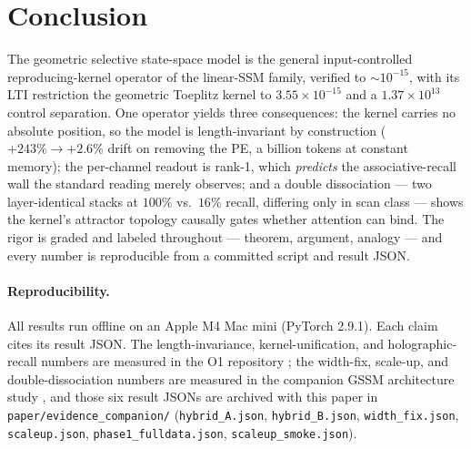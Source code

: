 \documentclass[11pt]{article}
\theoremstyle{definition}
\newcommand{\code}[1]{\texttt{#1}}
\begin{document}
\section{Conclusion}
The geometric selective state-space model is the general input-controlled reproducing-kernel
operator of the linear-SSM family, verified to $\sim\!10^{-15}$, with its LTI restriction the
geometric Toeplitz kernel to $3.55\times10^{-15}$ and a $1.37\times10^{13}$ control separation.
One operator yields three consequences: the kernel carries no absolute position, so the model is
length-invariant by construction ($+243\%\to+2.6\%$ drift on removing the PE, a billion tokens at
constant memory); the per-channel readout is rank-1, which \emph{predicts} the associative-recall
wall the standard reading merely observes; and a double dissociation --- two layer-identical stacks
at $100\%$ vs.\ $16\%$ recall, differing only in scan class --- shows the kernel's attractor
topology causally gates whether attention can bind. The rigor is graded and labeled throughout ---
theorem, argument, analogy --- and every number is reproducible from a committed script and result
JSON.

\paragraph{Reproducibility.} All results run offline on an Apple M4 Mac mini (PyTorch 2.9.1).
Each claim cites its result JSON. The length-invariance, kernel-unification, and holographic-recall
numbers are measured in the O1 repository \cite{foss2026o1}; the width-fix, scale-up, and
double-dissociation numbers are measured in the companion GSSM architecture study
\cite{foss2026gssm}, and those six result JSONs are archived with this paper in
\code{paper/evidence\_companion/} (\code{hybrid\_A.json}, \code{hybrid\_B.json},
\code{width\_fix.json}, \code{scaleup.json}, \code{phase1\_fulldata.json},
\code{scaleup\_smoke.json}).

{\small


}
\end{document}
